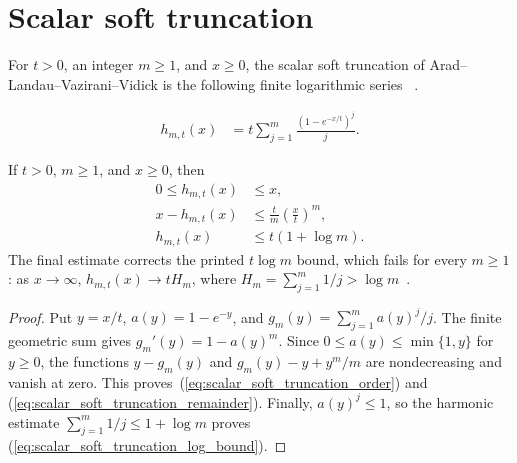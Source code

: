 \section{Scalar soft truncation}

For $t>0$, an integer $m\geq1$, and $x\geq0$, the scalar soft truncation of
Arad--Landau--Vazirani--Vidick is the following finite logarithmic series
~\cite[lines 1152--1173]{Arad2016RigorousRG}.

\begin{definition}
    \label{def:scalar_soft_truncation}
    \leanok
    \begin{align}
        h_{m,t}(x)
         & =t\sum_{j=1}^{m}\frac{{(1-e^{-x/t})}^{j}}{j}.
        \label{eq:scalar_soft_truncation_definition}
    \end{align}
\end{definition}

\begin{theorem}
    \label{thm:scalar_soft_truncation_bounds}
    \leanok
    If $t>0$, $m\geq1$, and $x\geq0$, then
    \begin{align}
        0\leq h_{m,t}(x) & \leq x,
        \label{eq:scalar_soft_truncation_order}                           \\
        x-h_{m,t}(x)     & \leq\frac{t}{m}{\left(\frac{x}{t}\right)}^{m},
        \label{eq:scalar_soft_truncation_remainder}                       \\
        h_{m,t}(x)       & \leq t(1+\log m).
        \label{eq:scalar_soft_truncation_log_bound}
    \end{align}
    The final estimate corrects the printed $t\log m$ bound, which fails for
    every $m\geq1$: as $x\to\infty$, $h_{m,t}(x)\to tH_m$, where
    $H_m=\sum_{j=1}^m 1/j>\log m$~\cite{gap:alvv16_soft_truncation_log_bound}.
\end{theorem}
\begin{proof}\leanok
    Put $y=x/t$, $a(y)=1-e^{-y}$, and
    $g_m(y)=\sum_{j=1}^{m}{a(y)}^{j}/j$. The finite geometric sum gives
    $g_m'(y)=1-{a(y)}^{m}$. Since $0\leq a(y)\leq\min\{1,y\}$ for $y\geq0$,
    the functions $y-g_m(y)$ and $g_m(y)-y+y^m/m$ are nondecreasing and
    vanish at zero. This proves~(\ref{eq:scalar_soft_truncation_order}) and
    (\ref{eq:scalar_soft_truncation_remainder}). Finally,
    ${a(y)}^{j}\leq1$, so the harmonic estimate
    $\sum_{j=1}^{m}1/j\leq1+\log m$ proves
    (\ref{eq:scalar_soft_truncation_log_bound}).
\end{proof}


